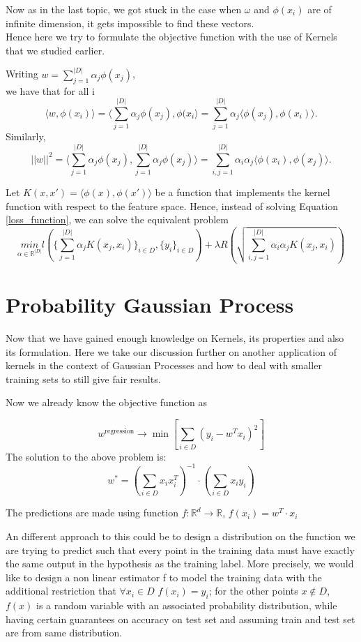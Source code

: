 \documentclass[12pt]{article}
\begin{document}
Now as in the last topic, we got stuck in the case when $\omega$ and $\phi(x_{i})$ are of infinite dimension, it gets impossible to find these vectors.\\
Hence here we try to formulate the objective function with the use of Kernels that we studied earlier.

Writing $w = \sum_{j=1}^{|D|} \alpha_{j} \phi(x_j)$,\\
we have that for all i
\[\langle w, \phi(x_{i})\rangle = \langle \sum_{j=1}^{|D|} \alpha_{j} \phi(x_j),\phi(x_{i}\rangle = \sum_{j = 1}^{|D|} \alpha_j \langle \phi(x_j), \phi(x_i)\rangle .\]
Similarly,
\[ ||w||^{2}  = \langle \sum_{j=1}^{|D|} \alpha_{j} \phi(x_j), \sum_{j=1}^{|D|} \alpha_{j} \phi(x_j) \rangle =  \sum_{i,j = 1}^{|D|} \alpha_i \alpha_j \langle \phi(x_i), \phi(x_j)\rangle .\]

Let $K(x,x') = \langle \phi(x), \phi(x') \rangle$ be a function that implements the kernel function
with respect to the feature space.
Hence, instead of solving Equation \ref{loss_function}, we can solve the equivalent problem
\begin{equation}
\underset{\alpha \in \mathbb{R}^{|D|}}{min}  l (\{\sum_{j=1}^{|D|}\alpha_j K(x_j,x_{i})\}_{i \in D}, \{y_{i}\}_{i \in D} ) + \lambda R(\sqrt{\sum_{i,j =1}^{|D|} \alpha_i \alpha_j K(x_{j},x_{i})})   
\end{equation}
\section{Probability Gaussian Process}

Now that we have gained enough knowledge on Kernels, its properties and also its formulation. Here we take our discussion further on another application of kernels in the context of Gaussian Processes and how to deal with smaller training sets to still give fair results.

Now we already know the objective function as

\[w^{\text{regression}}\rightarrow \min \left[\sum_{i\in D}(y_i -w^Tx_i)^2\right]\]
The solution to the above problem is:
\[w^{*} = (\sum_{i \in D}x_ix_i^T)^{-1}\cdot(\sum_{i\in D}x_iy_i)\]

The predictions are made using function $f:\mathbb{R}^d\rightarrow \mathbb{R}$, $f(x_i) = w^T\cdot x_i$

An different approach to this could be to design a distribution on the function we are trying to predict such that every point in the training data must have exactly the same output in the hypothesis as the training label. More precisely,
we would like to design a non linear estimator f to model the training data with the additional restriction that $\forall x_i \in D$ $f(x_i) = y_i$; for the other points $x \notin D$, $f(x)$ is a random variable with an associated probability distribution, while having certain guarantees on accuracy on test set and assuming train and test set are from same distribution.\\
\end{document}
